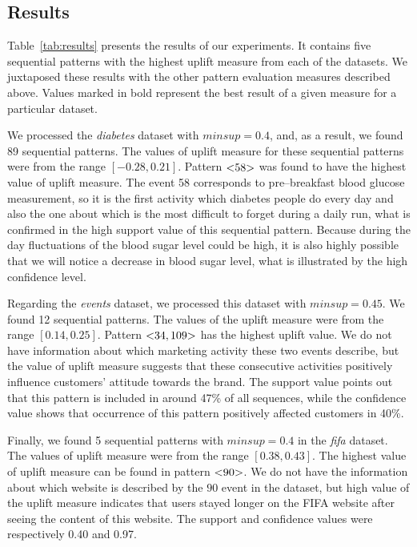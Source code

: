 \documentclass[runningheads,a4paper]{llncs}
\begin{document}
\subsection{Results}
Table~\ref{tab:results} presents the results of our experiments.
It contains five sequential patterns with the highest uplift measure from each of the datasets.
We juxtaposed these results with the other pattern evaluation measures described above.
Values marked in bold represent the best result of a given measure for a particular dataset.

We processed the \textit{diabetes} dataset with $\textit{minsup} = 0.4$, and, as a result, we found 89 sequential patterns.
The values of uplift measure for these sequential patterns were from the range $[-0.28, 0.21]$.
Pattern $\text{\textless} 58\text{\textgreater}$ was found to have the highest value of uplift measure.
The event 58 corresponds to pre--breakfast blood glucose measurement, so it is the first activity which diabetes people do every day and also the one about which is the most difficult to forget during a daily run, what is confirmed in the high support value of this sequential pattern.
Because during the day fluctuations of the blood sugar level could be high, it is also highly possible that we will notice a decrease in blood sugar level, what is illustrated by the high confidence level.

Regarding the \textit{events} dataset, we processed this dataset with $\textit{minsup} = 0.45$.
We found 12 sequential patterns.
The values of the uplift measure were from the range $[0.14, 0.25]$.
Pattern $\text{\textless} 34, 109\text{\textgreater}$ has the highest uplift value.
We do not have information about which marketing activity these two events describe, but the value of uplift measure suggests that these consecutive activities positively influence customers’ attitude towards the brand.
The support value points out that this pattern is included in around 47\% of all sequences, while the confidence value shows that occurrence of this pattern positively affected customers in 40\%.

Finally, we found 5 sequential patterns with $\textit{minsup}=0.4$ in the \textit{fifa} dataset.
The values of uplift measure were from the range $[0.38, 0.43]$.
The highest value of uplift measure can be found in pattern $\text{\textless} 90\text{\textgreater}$.
We do not have the information about which website is described by the $90$ event in the dataset, but high value of the uplift measure indicates that users stayed longer on the FIFA website after seeing the content of this website.
The support and confidence values were respectively 0.40 and 0.97.
\end{document}
